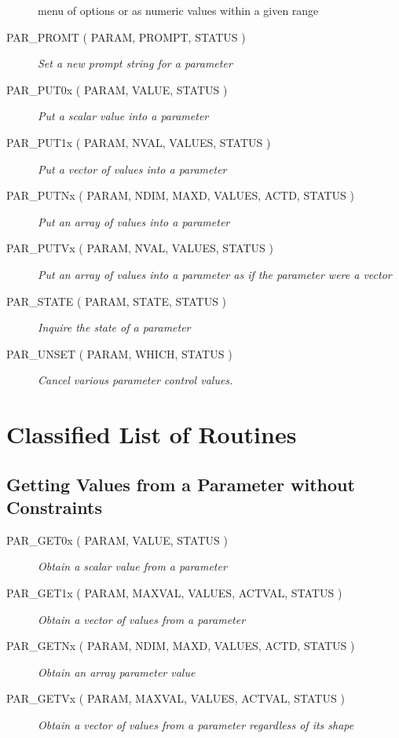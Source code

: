 \documentclass[twoside,11pt]{article}
\newcommand{\htmlref}[2]{#1}
\newcommand{\xlabel}[1]{}
\newcommand{\listline}{\hspace{1pt}\\}
\renewcommand{\listline}{}
\begin{document}
\begin{description}
{            menu of options or as numeric values within a given range}
\item [\htmlref{PAR\_PROMT}{PAR_PROMT} 
( PARAM, PROMPT, STATUS )] \listline
\textit{Set a new prompt string for a parameter}
\item [\htmlref{PAR\_PUT0x}{PAR_PUT0x} 
( PARAM, VALUE, STATUS )] \listline
\textit{Put a scalar value into a parameter}
\item [\htmlref{PAR\_PUT1x}{PAR_PUT1x} 
( PARAM, NVAL, VALUES, STATUS )] \listline
\textit{Put a vector of values into a parameter}
\item [\htmlref{PAR\_PUTNx}{PAR_PUTNx} 
( PARAM, NDIM, MAXD, VALUES, ACTD, STATUS )] \listline
\textit{Put an array of values into a parameter}
\item [\htmlref{PAR\_PUTVx}{PAR_PUTVx} 
( PARAM, NVAL, VALUES, STATUS )] \listline
\textit{Put an array of values into a parameter as if the parameter were a vector}
\item [\htmlref{PAR\_STATE}{PAR_STATE} 
( PARAM, STATE, STATUS )] \listline
\textit{Inquire the state of a parameter}
\item [\htmlref{PAR\_UNSET}{PAR_UNSET} 
( PARAM, WHICH, STATUS )] \listline
\textit{Cancel various parameter control values.}
\end{description}

\section{\xlabel{classified_list_of_routines}Classified List of Routines}
\subsection{\xlabel{getting_values_from_a_parameter_without_constraints}Getting Values from a Parameter without Constraints}
\begin{description}
\item [\htmlref{PAR\_GET0x}{PAR_GET0x} 
( PARAM, VALUE, STATUS )] \listline
\textit{Obtain a scalar value from a parameter}
\item [\htmlref{PAR\_GET1x}{PAR_GET1x} 
( PARAM, MAXVAL, VALUES, ACTVAL, STATUS )] \listline
\textit{Obtain a vector of values from a parameter}
\item [\htmlref{PAR\_GETNx}{PAR_GETNx} 
( PARAM, NDIM, MAXD, VALUES, ACTD, STATUS )] \listline
\textit{Obtain an array parameter value}
\item [\htmlref{PAR\_GETVx}{PAR_GETVx} 
( PARAM, MAXVAL, VALUES, ACTVAL, STATUS )] \listline
\textit{Obtain a vector of values from a parameter regardless of its shape}
\end{description}
\end{document}
